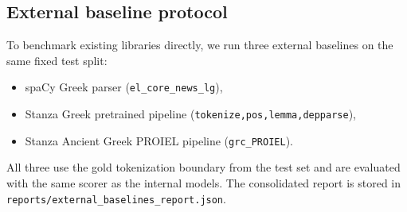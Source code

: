 \subsection{External baseline protocol}



To benchmark existing libraries directly, we run three external baselines on the same fixed test split:

\begin{itemize}[leftmargin=1.25em]

  \item spaCy Greek parser (\texttt{el\_core\_news\_lg}),

  \item Stanza Greek pretrained pipeline (\texttt{tokenize,pos,lemma,depparse}),

  \item Stanza Ancient Greek PROIEL pipeline (\texttt{grc\_PROIEL}).

\end{itemize}



All three use the gold tokenization boundary from the test set and are evaluated with the same scorer as the internal models. The consolidated report is stored in \texttt{reports/external\_baselines\_report.json}.

